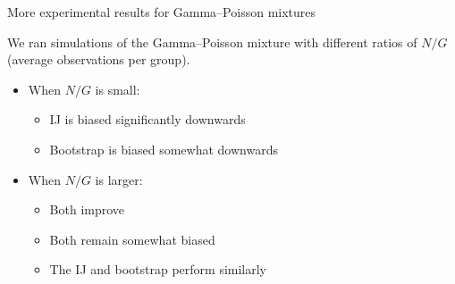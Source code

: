 \begin{frame}{More experimental results for Gamma--Poisson mixtures}
    \begin{minipage}[c]{0.35\textwidth}
        We ran simulations of the Gamma--Poisson mixture with
        different ratios of $N / G$ \\(average observations per group).

        \spskip
        \begin{itemize}
            \item When $N/G$ is small:
            \begin{itemize}
                \item IJ is biased significantly downwards
                \item Bootstrap is biased somewhat downwards
            \end{itemize}
            \item When $N/G$ is larger:
            \begin{itemize}
                \item Both improve
                \item Both remain somewhat biased
                \item The IJ and bootstrap perform similarly
            \end{itemize}
        \end{itemize}
    \end{minipage}
    \begin{minipage}[c]{0.6\textwidth}
    \PoissonREGraph{}
    \end{minipage}
\end{frame}



